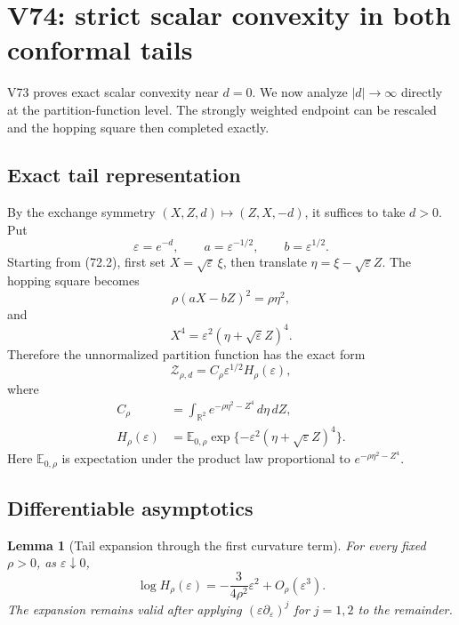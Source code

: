 \documentclass[11pt]{article}
\newtheorem{lemma}[theorem]{Lemma}
\theoremstyle{remark}
\begin{document}
\section{V74: strict scalar convexity in both conformal tails}
\label{sec:v17v74}

V73 proves exact scalar convexity near \(d=0\).  We now analyze
\(|d|\to\infty\) directly at the partition-function level.  The
strongly weighted endpoint can be rescaled and the hopping square then
completed exactly.

\subsection{Exact tail representation}

By the exchange symmetry \((X,Z,d)\mapsto(Z,X,-d)\), it suffices to
take \(d>0\).  Put
\[
 \varepsilon=e^{-d},
 \qquad a=\varepsilon^{-1/2},
 \qquad b=\varepsilon^{1/2}.                      \tag{74.1}
\]
Starting from (72.2), first set \(X=\sqrt\varepsilon\,\xi\), then
translate \(\eta=\xi-\sqrt\varepsilon Z\).  The hopping square becomes
\[
 \rho(aX-bZ)^2=\rho\eta^2,                        \tag{74.2}
\]
and
\[
 X^4=\varepsilon^2(\eta+\sqrt\varepsilon Z)^4.   \tag{74.3}
\]
Therefore the unnormalized partition function has the exact form
\[
\boxed{
 \mathcal Z_{\rho,d}
 =C_\rho\varepsilon^{1/2}H_\rho(\varepsilon),}    \tag{74.4}
\]
where
\[
\begin{aligned}
 C_\rho&=
 \int_{\mathbb R^2}e^{-\rho\eta^2-Z^4}\,d\eta\,dZ,\\
 H_\rho(\varepsilon)&=
 \mathbb E_{0,\rho}
 \exp\{-\varepsilon^2(\eta+\sqrt\varepsilon Z)^4\}.             \tag{74.5}
\end{aligned}
\]
Here \(\mathbb E_{0,\rho}\) is expectation under the product law
proportional to \(e^{-\rho\eta^2-Z^4}\).

\subsection{Differentiable asymptotics}

\begin{lemma}[Tail expansion through the first curvature term]
\label{lem:v17v74-expansion}
For every fixed \(\rho>0\), as \(\varepsilon\downarrow0\),
\[
\boxed{
 \log H_\rho(\varepsilon)
 =-\frac{3}{4\rho^2}\varepsilon^2+O_\rho(\varepsilon^3).}         \tag{74.6}
\]
The expansion remains valid after applying
\((\varepsilon\partial_\varepsilon)^j\) for \(j=1,2\) to the
remainder.
\end{lemma}
\end{document}
